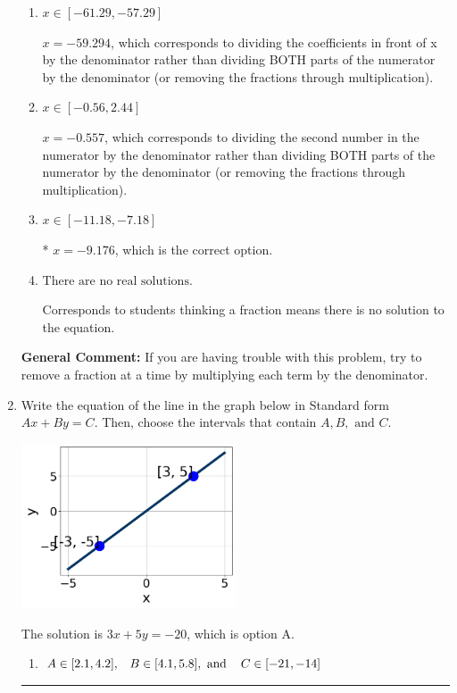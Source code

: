 \documentclass{extbook}[14pt]
\newcommand{\litem}[1]{\item #1

\rule{\textwidth}{0.4pt}}
\begin{document}
\begin{enumerate}
{\begin{enumerate}[label=\Alph*.]
 $x = -4.235$, which corresponds to not distributing the negative in front of the second fraction.
\item \( x \in [-61.29, -57.29] \)

 $x = -59.294$, which corresponds to dividing the coefficients in front of x by the denominator rather than dividing BOTH parts of the numerator by the denominator (or removing the fractions through multiplication).
\item \( x \in [-0.56, 2.44] \)

 $x = -0.557$, which corresponds to dividing the second number in the numerator by the denominator rather than dividing BOTH parts of the numerator by the denominator (or removing the fractions through multiplication).
\item \( x \in [-11.18, -7.18] \)

* $x = -9.176$, which is the correct option.
\item \( \text{There are no real solutions.} \)

Corresponds to students thinking a fraction means there is no solution to the equation.
\end{enumerate}

\textbf{General Comment:} If you are having trouble with this problem, try to remove a fraction at a time by multiplying each term by the denominator.
}
\litem{
Write the equation of the line in the graph below in Standard form $Ax+By=C$. Then, choose the intervals that contain $A, B, \text{ and } C$.

\begin{center}
    \includegraphics[width=0.5\textwidth]{../Figures/linearGraphToStandardCopyC.png}
\end{center}




The solution is \( 3x + 5y = -20 \), which is option A.\begin{enumerate}[label=\Alph*.]
\item \( A \in [2.1, 4.2], \hspace{3mm} B \in [4.1, 5.8], \text{ and } \hspace{3mm} C \in [-21, -14] \)


\end{enumerate}}
\end{enumerate}
\end{document}
